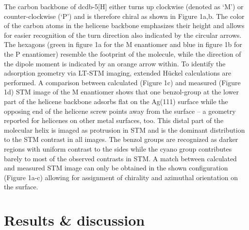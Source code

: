 The carbon backbone of dcdb-5[H] either turns up clockwise (denoted as ‘M’) or counter-clockwise (‘P’) and is therefore chiral as shown in Figure 1a,b. The color of the carbon atoms in the helicene backbone emphasizes their height and allows for easier recognition of the turn direction also indicated by the circular arrows. The hexagons (green in figure 1a for the M enantiomer and blue in figure 1b for the P enantiomer) resemble the footprint of the molecule, while the direction of the dipole moment is indicated by an orange arrow within. To identify the adsorption geometry via LT-STM imaging, extended Hückel calculations are performed. A comparison between calculated (Figure 1c) and measured (Figure 1d) STM image of the M enantiomer shows that one benzol-group at the lower part of the helicene backbone  adsorbs flat on the Ag(111) surface while the opposing end of the helicene screw points away from the surface – a geometry reported for helicenes on other metal surfaces, too.\cite{} This distal part of the molecular helix is imaged as protrusion in STM and is the dominant distribution to the STM contrast in all images. The benzol groups are recognized as darker regions with uniform contrast to the sides while the cyano group contributes barely to most of the observed contrasts in STM. A match between calculated and measured STM image can only be obtained in the shown configuration (Figure 1a-c) allowing for assignment of chirality and azimuthal orientation on the surface.

\section{Results \& discussion}
